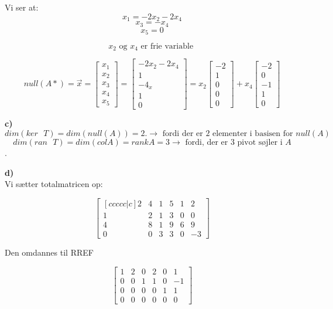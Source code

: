 \documentclass[12pt]{article}
\begin{document}
{Vi ser at:
\[x_1 = -2x_2 - 2x_4\]
\[x_3 = -x_4\]
\[x_5 = 0\]

\[x_2 \text{ og }  x_4 \text{ er frie variable }\]

\[ null(A*) =    \vec{x} = \begin{bmatrix}
x_1\\x_2\\x_3\\x_4\\x_5 
\end{bmatrix} = 
\begin{bmatrix} 
-2x_2 - 2x_4\\ 1 \\-4_x \\1 \\0
\end{bmatrix} =
x_2
\begin{bmatrix} 
-2\\ 1 \\0 \\0 \\0
\end{bmatrix} + x_4
\begin{bmatrix} 
- 2\\ 0 \\-1 \\1 \\0
\end{bmatrix} 
\]

\textbf{c)}\\

\[dim(ker \text{ } T) = dim( null(A) ) = 2. \rightarrow \text{ fordi der er 2 elementer i basisen for } null(A)\]
\[dim(ran \text{ } T) = dim(col A) = rank A = 3 \rightarrow \text{ fordi, der er 3 pivot søjler i } A \] .

\textbf{d)}\\

Vi sætter totalmatricen op:

\[
\begin{bmatrix}[ccccc|c]
2 & 4 & 1 & 5 & 1 & 2\\
1 & 2 & 1 & 3 & 0 & 0 \\
4 & 8 & 1 & 9 & 6 & 9 \\
0 & 0 & 3 & 3 & 0 & -3
\end{bmatrix}
\]

Den omdannes til RREF

\[
\begin{bmatrix}
1 & 2 & 0 & 2 & 0 & 1\\
0 & 0 & 1 & 1 & 0 & -1 \\
0 & 0 & 0 & 0 & 1 & 1 \\
0 & 0 & 0 & 0 & 0 & 0
\end{bmatrix}
\]

}
\end{document}
